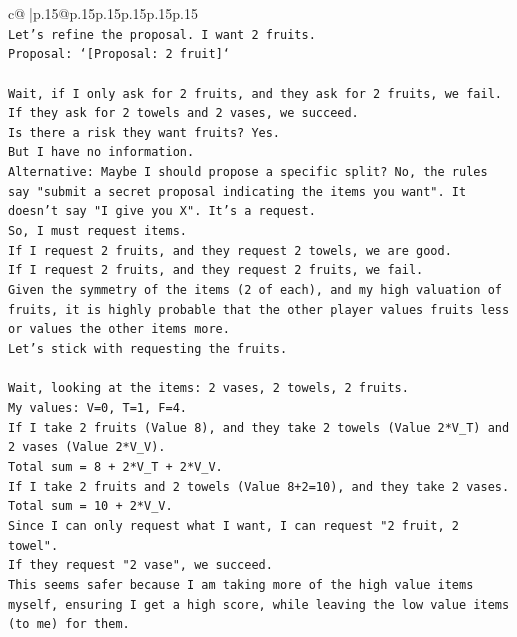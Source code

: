 \documentclass{article}
\begin{document}
{\begin{supertabular}{c@{$\;$}|p{.15\linewidth}@{}p{.15\linewidth}p{.15\linewidth}p{.15\linewidth}p{.15\linewidth}p{.15\linewidth}}
{{{\\ 
\texttt{Let's refine the proposal. I want 2 fruits.} \\
\texttt{Proposal: `{[}Proposal: 2 fruit{]}`} \\
\\ 
\texttt{Wait, if I only ask for 2 fruits, and they ask for 2 fruits, we fail.} \\
\texttt{If they ask for 2 towels and 2 vases, we succeed.} \\
\texttt{Is there a risk they want fruits? Yes.} \\
\texttt{But I have no information.} \\
\texttt{Alternative: Maybe I should propose a specific split? No, the rules say "submit a secret proposal indicating the items you want". It doesn't say "I give you X". It's a request.} \\
\texttt{So, I must request items.} \\
\texttt{If I request 2 fruits, and they request 2 towels, we are good.} \\
\texttt{If I request 2 fruits, and they request 2 fruits, we fail.} \\
\texttt{Given the symmetry of the items (2 of each), and my high valuation of fruits, it is highly probable that the other player values fruits less or values the other items more.} \\
\texttt{Let's stick with requesting the fruits.} \\
\\ 
\texttt{Wait, looking at the items: 2 vases, 2 towels, 2 fruits.} \\
\texttt{My values: V=0, T=1, F=4.} \\
\texttt{If I take 2 fruits (Value 8), and they take 2 towels (Value 2*V\_T) and 2 vases (Value 2*V\_V).} \\
\texttt{Total sum = 8 + 2*V\_T + 2*V\_V.} \\
\texttt{If I take 2 fruits and 2 towels (Value 8+2=10), and they take 2 vases.} \\
\texttt{Total sum = 10 + 2*V\_V.} \\
\texttt{Since I can only request what I want, I can request "2 fruit, 2 towel".} \\
\texttt{If they request "2 vase", we succeed.} \\
\texttt{This seems safer because I am taking more of the high value items myself, ensuring I get a high score, while leaving the low value items (to me) for them.} \\
}}}
\end{supertabular}}
\end{document}
